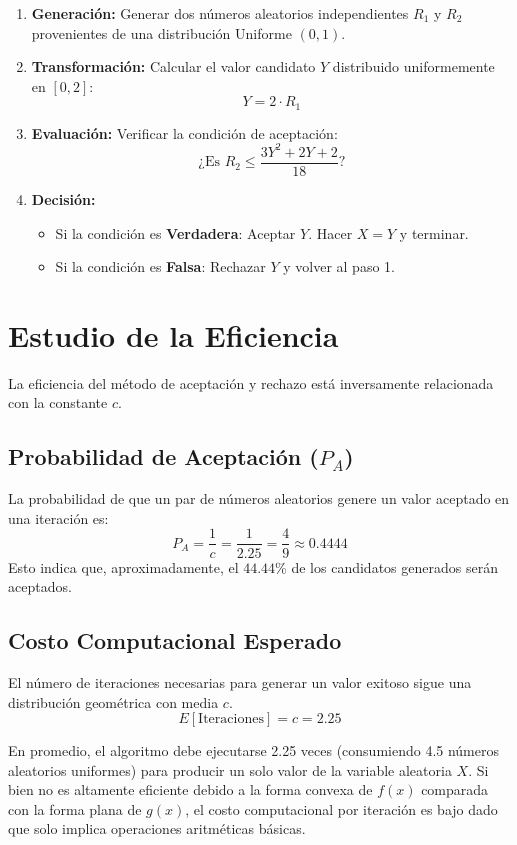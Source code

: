 \documentclass[12pt, a4paper]{article}
\begin{document}
	\begin{enumerate}
		\item \textbf{Generación:} Generar dos números aleatorios independientes $R_1$ y $R_2$ provenientes de una distribución Uniforme $(0, 1)$.
		\item \textbf{Transformación:} Calcular el valor candidato $Y$ distribuido uniformemente en $[0, 2]$:
		\[ Y = 2 \cdot R_1 \]
		\item \textbf{Evaluación:} Verificar la condición de aceptación:
		\[ \text{¿Es } R_2 \leq \frac{3Y^2 + 2Y + 2}{18} \text{?} \]
		\item \textbf{Decisión:}
		\begin{itemize}
			\item Si la condición es \textbf{Verdadera}: Aceptar $Y$. Hacer $X = Y$ y terminar.
			\item Si la condición es \textbf{Falsa}: Rechazar $Y$ y volver al paso 1.
		\end{itemize}
	\end{enumerate}
	
	\section{Estudio de la Eficiencia}
	
	La eficiencia del método de aceptación y rechazo está inversamente relacionada con la constante $c$.
	
	\subsection{Probabilidad de Aceptación ($P_A$)}
	La probabilidad de que un par de números aleatorios genere un valor aceptado en una iteración es:
	\begin{equation}
		P_A = \frac{1}{c} = \frac{1}{2.25} = \frac{4}{9} \approx 0.4444
	\end{equation}
	Esto indica que, aproximadamente, el $44.44\%$ de los candidatos generados serán aceptados.
	
	\subsection{Costo Computacional Esperado}
	El número de iteraciones necesarias para generar un valor exitoso sigue una distribución geométrica con media $c$.
	\begin{equation}
		E[\text{Iteraciones}] = c = 2.25
	\end{equation}
	
	En promedio, el algoritmo debe ejecutarse 2.25 veces (consumiendo 4.5 números aleatorios uniformes) para producir un solo valor de la variable aleatoria $X$. Si bien no es altamente eficiente debido a la forma convexa de $f(x)$ comparada con la forma plana de $g(x)$, el costo computacional por iteración es bajo dado que solo implica operaciones aritméticas básicas.
	
\end{document}
